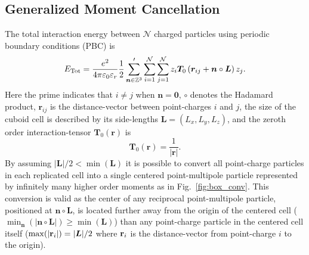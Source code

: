 \documentclass[
journal=jctcce,
manuscript=letter]{achemso}
\begin{document}
\subsection{Generalized Moment Cancellation}\label{sec:gentheory}


The total interaction energy between $\mathcal{N}$ charged particles using periodic boundary conditions (PBC) is
\begin{equation}
\label{eq:energy_pbc}
E_{\rm Tot} = \frac{e^2}{4\pi\varepsilon_0\varepsilon_r}\frac{1}{2}\sum_{\boldsymbol{n}\in \mathbb{Z}^3}^{\prime}\sum_{i=1}^{\mathcal{N}}\sum_{j = 1}^{\mathcal{N}} z_i\boldsymbol{T}_0\left( \boldsymbol{r}_{ij} + \boldsymbol{n}\circ\boldsymbol{L} \right) z_j.
\end{equation}
Here the prime indicates that $i\ne j$ when $\boldsymbol{n}=\boldsymbol{0}$, $\circ$ denotes the Hadamard product, $\boldsymbol{r}_{ij}$ is the distance-vector between point-charges $i$ and $j$, the size of the cuboid cell is described by its side-lengths $\boldsymbol{L}=(L_x,L_y,L_z)$, and the zeroth order interaction-tensor $\boldsymbol{T}_0(\boldsymbol{r})$ is
\begin{equation}
\boldsymbol{T}_0(\boldsymbol{r}) = \frac{1}{|\boldsymbol{r}|}.
\end{equation}
By assuming $|\boldsymbol{L}|/2 < \min(\boldsymbol{L})$ it is possible to convert all point-charge particles in each replicated cell into a single centered point-multipole particle represented by infinitely many higher order moments\cite{bottcher1978theory,stone2013theory} as in Fig.~\ref{fig:box_conv}. This conversion is valid as the center of any reciprocal point-multipole particle, positioned at $\boldsymbol{n}\circ\boldsymbol{L}$, is located further away from the origin of the centered cell ($\min_{\boldsymbol{n}}(|\boldsymbol{n}\circ\boldsymbol{L}|)\ge \min(\boldsymbol{L})$) than any point-charge particle in the centered cell itself ($\max(|{\bf r}_{i}|)=|\boldsymbol{L}|/2$ where ${\bf r}_{i}$ is the distance-vector from point-charge $i$ to the origin). 
\end{document}

